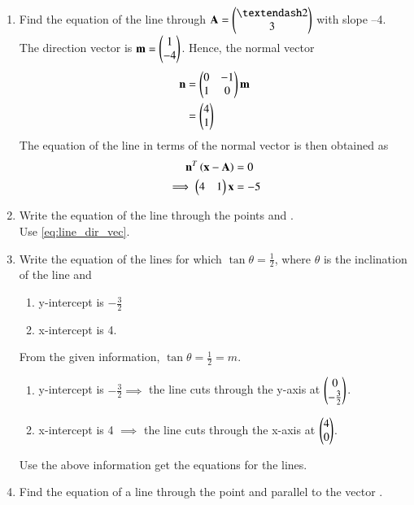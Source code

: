 \begin{enumerate}[label=\arabic*.,ref=\thesubsection.\theenumi]
\item Find the equation of the line through $\vec{A}=\myvec{– 2\\ 3}$ with slope –4.
\\
\solution The direction vector is $\mathbf{m} = \begin{pmatrix}1\\-4\end{pmatrix}$.  Hence, the normal vector
\begin{align}
\label{eq:line_norm_dir}
\mathbf{n} &= \begin{pmatrix}0&-1\\1&0\end{pmatrix}\mathbf{m} 
\\
&= \begin{pmatrix}4\\1\end{pmatrix}
\end{align}
%
The equation of the line in terms of the normal vector is then obtained as
\begin{align}
\label{eq:line_norm_vec}
\mathbf{n}^T\left(\mathbf{x}-\mathbf{A}\right) &= 0
\\
\implies \begin{pmatrix}4 & 1\end{pmatrix} \mathbf{x} &= -5
\end{align}
%
\item Write the equation of the line through the points  and .
%
\\
\solution Use \eqref{eq:line_dir_vec}.
\item Write the equation of the lines for which $\tan \theta = \frac{1}{2}$, where $\theta$ is the inclination of the line and 
\label{prob:line_intercept}
\begin{enumerate}
\item y-intercept is $-\frac{3}{2}$
\item x-intercept is 4.
\end{enumerate}
%
\solution From the given information, $\tan \theta = \frac{1}{2}=m $.
\begin{enumerate}
\item y-intercept is $-\frac{3}{2} \implies $ the line cuts through the y-axis at $\begin{pmatrix}0\\-\frac{3}{2}\end{pmatrix}$.
\item x-intercept is 4 $\implies$ the line cuts through the x-axis at $\begin{pmatrix}4\\0\end{pmatrix}$.
\end{enumerate}
%
Use the above information get the equations for the lines.
%
\item Find the equation of a line through the point  and parallel to the vector .

\end{enumerate}
